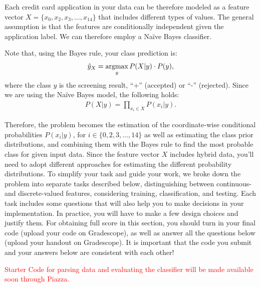 Each credit card application in your data can be therefore modeled as a feature vector $X = \{x_{0},x_{2},x_{3},\ldots ,x_{14}\}$ that includes different types of values. The general assumption is that the features are conditionally independent given the application label. We can therefore employ a Na\"{i}ve Bayes classifier.  

Note that, using the Bayes rule, your class prediction is:
\begin{gather}
    \hat{y}_{X} = \mathop{\mathrm{argmax}}_{y} P(X|y) \cdot P(y) ,
\end{gather}
%
where the class $y$ is the screening result, ``+'' (accepted) or ``-'' (rejected). Since we are using the Na\"{i}ve Bayes model, the following holds:
\begin{gather}
    P(X|y) = \prod_{x_{i} \in X} P(x_{i}|y).
\end{gather}
%

Therefore, the problem becomes the estimation of the coordinate-wise conditional probabilities $P(x_{i} | y)$,  for $i \in \{0,2,3,\ldots ,14\}$ as well as estimating the class prior distributions, and combining them with the Bayes rule to find the most probable class for given input data. Since the feature vector $X$ includes hybrid data, you'll need to adopt different approaches for estimating the different probability distributions. To simplify your task and guide your work, we broke down the problem into separate tasks described below, distinguishing between continuous- and discrete-valued features, considering training, classification, and testing. Each task includes some questions that will also help you to make decisions in your implementation. In practice, you will have to make a few design choices and justify them. For obtaining full score in this section, you should turn in your final code (upload your code on Gradescope), as well as answer all the questions below (upload your handout on Gradescope). It is important that the code you submit and your answers below are consistent with each other!

\textcolor{red}{Starter Code for parsing data and evaluating the classifier will be made available soon through Piazza.}

